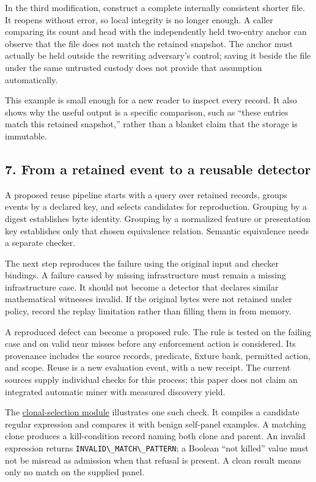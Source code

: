 \documentclass[
  11pt,
]{article}
\newcommand{\passthrough}[1]{#1}
\begin{document}
In the third modification, construct a complete internally consistent
shorter file. It reopens without error, so local integrity is no longer
enough. A caller comparing its count and head with the independently
held two-entry anchor can observe that the file does not match the
retained snapshot. The anchor must actually be held outside the
rewriting adversary's control; saving it beside the file under the same
untrusted custody does not provide that assumption automatically.

This example is small enough for a new reader to inspect every record.
It also shows why the useful output is a specific comparison, such as
``these entries match this retained snapshot,'' rather than a blanket
claim that the storage is immutable.

\subsection{7. From a retained event to a reusable
detector}\label{from-a-retained-event-to-a-reusable-detector}

A proposed reuse pipeline starts with a query over retained records,
groups events by a declared key, and selects candidates for
reproduction. Grouping by a digest establishes byte identity. Grouping
by a normalized feature or presentation key establishes only that chosen
equivalence relation. Semantic equivalence needs a separate checker.

The next step reproduces the failure using the original input and
checker bindings. A failure caused by missing infrastructure must remain
a missing infrastructure case. It should not become a detector that
declares similar mathematical witnesses invalid. If the original bytes
were not retained under policy, record the replay limitation rather than
filling them in from memory.

A reproduced defect can become a proposed rule. The rule is tested on
the failing case and on valid near misses before any enforcement action
is considered. Its provenance includes the source records, predicate,
fixture bank, permitted action, and scope. Reuse is a new evaluation
event, with a new receipt. The current sources supply individual checks
for this process; this paper does not claim an integrated automatic
miner with measured discovery yield.

The
\href{https://github.com/dbccpage/the_symbol_game/blob/52cb5457f6c485ba548cfd292f6012a941ed22cf/omega_engine_symbol_game/domain/immune/clonal_selection.py}{clonal-selection
module} illustrates one such check. It compiles a candidate regular
expression and compares it with benign self-panel examples. A matching
clone produces a kill-condition record naming both clone and parent. An
invalid expression returns
\passthrough{\lstinline!INVALID\_MATCH\_PATTERN!}; a Boolean ``not
killed'' value must not be misread as admission when that refusal is
present. A clean result means only no match on the supplied panel.
\end{document}
